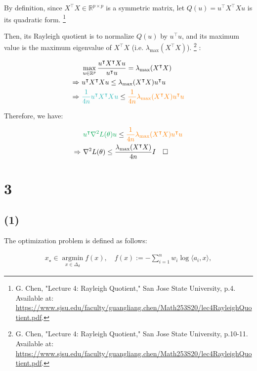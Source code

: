 \documentclass{article}
\begin{document}
By definition, since $X^\intercal X \in \mathbb{R}^{p \times p}$ is a symmetric matrix,
let $Q(u) = u^\intercal X^\intercal X u$ is its quadratic form.
\footnote{G. Chen, "Lecture 4: Rayleigh Quotient," San Jose State University, p.4. Available at: \url{https://www.sjsu.edu/faculty/guangliang.chen/Math253S20/lec4RayleighQuotient.pdf}.}
\bigskip

Then, its Rayleigh quotient is to normalize $Q(u)$ by $u^\intercal u$, 
and its maximum value is the maximum eigenvalue of $X^\intercal X$ (i.e. $\lambda_{\max}(X^\intercal X)$).
\footnote{G. Chen, "Lecture 4: Rayleigh Quotient," San Jose State University, p.10-11. Available at: \url{https://www.sjsu.edu/faculty/guangliang.chen/Math253S20/lec4RayleighQuotient.pdf}.}
:

\begin{align*}
    &\max_{u \in \mathbb{R}^p} \frac{u^\intercal X^\intercal X u}{u^\intercal u}
    = \lambda_{\max}(X^\intercal X) \\
    \Rightarrow \ & u^\intercal X^\intercal X u
    \leq \lambda_{\max}(X^\intercal X) u^\intercal u \\
    \Rightarrow \ & \textcolor{BlueGreen}{\frac{1}{4n} u^\intercal X^\intercal X u}
    \leq \textcolor{orange}{\frac{1}{4n} \lambda_{\max}(X^\intercal X) u^\intercal u} \\
\end{align*}

Therefore, we have:

\begin{align*}
    &\textcolor{Green}{u^\intercal \nabla^2 L (\theta) u} 
    \leq \textcolor{orange}{\frac{1}{4n} \lambda_{\max}(X^\intercal X) u^\intercal u} \\
    \Rightarrow \ & \nabla^2 L (\theta) \leq \frac{\lambda_{\max}(X^\intercal X)}{4n} I \quad \square
\end{align*}

\section*{3}

\subsection*{(1)}

The optimization problem is defined as follows:

\begin{align*}
    x_\star \in \underset{x \in \Delta_d} {\operatorname{argmin}} f ( x ), \quad f ( x ) := - \sum_{i = 1}^n w_i \log \langle a_i, x \rangle , \tag{P}
\end{align*}
\end{document}
